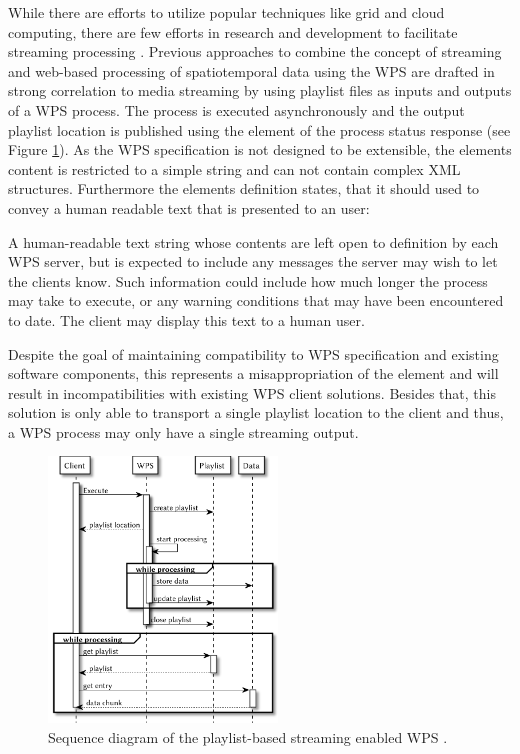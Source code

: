 	While there are efforts to utilize popular techniques like grid and cloud computing, there are few efforts in research and development to facilitate streaming processing \citep{foerster2012live}. Previous approaches to combine the concept of streaming and web-based processing of spatiotemporal data using the \ac{WPS} are drafted in strong correlation to media streaming \citep{foerster2012live} by using playlist files \citep{ietf:draft-pantos-http-live-streaming-12} as inputs and outputs of a \ac{WPS} process. The process is executed asynchronously and the output playlist location is published using the  element of the process status response (see Figure \ref{fig:sd:previous}). As the \ac{WPS} specification is not designed to be extensible, the elements content is restricted to a simple string and can not contain complex \ac{XML} structures. Furthermore the elements definition states, that it should used to convey a human readable text that is presented to an user:
	\begin{signedquote}{\cite{ogc:wps}}
		A human-readable text string whose contents are left open to definition by each WPS server, but is expected to include any messages the server may wish to let the clients know. Such information could include how much longer the process may take to execute, or any warning conditions that may have been encountered to date. The client may display this text to a human user.
	\end{signedquote}
	Despite the goal of maintaining compatibility to \ac{WPS} specification and existing software components, this represents a misappropriation of the element and will result in incompatibilities with existing \ac{WPS} client solutions. Besides that, this solution is only able to transport a single playlist location to the client and thus, a \ac{WPS} process may only have a single streaming output.

	\begin{figure}[!htb]
		\centering
		\includegraphics[width=0.54225352112676062\textwidth]{figures/sequence-diagramm-previous.pdf}
		\caption{\label{fig:sd:previous}Sequence diagram of the playlist-based streaming enabled WPS \citep{foerster2012live}.}
	\end{figure}

